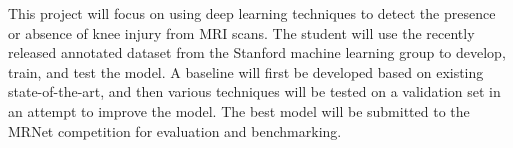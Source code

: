 \documentclass[a4paper]{article}
\begin{document}
This project will focus on using deep learning techniques to detect the presence or absence of knee injury from MRI scans. The student will use the recently released annotated dataset from the Stanford machine learning group to develop, train, and test the model. A baseline will first be developed based on existing state-of-the-art, and then various techniques will be tested on a validation set in an attempt to improve the model. The best model will be submitted to the MRNet competition for evaluation and benchmarking.
\end{document}
